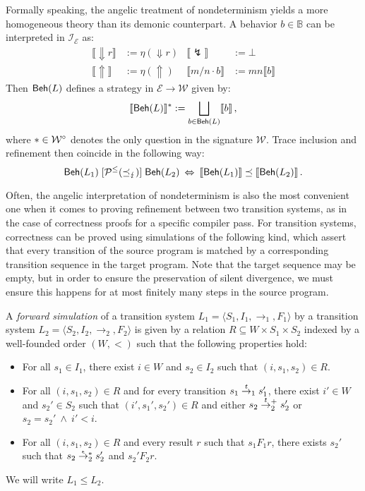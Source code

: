 \documentclass[sigplan,10pt,authordraft]{acmart}
\begin{document}
Formally speaking,
the angelic treatment of nondeterminism
yields a more homogeneous theory
than its demonic counterpart.
A behavior $b \in \mathbb{B}$ can be interpreted
in $\mathcal{I}_\mathcal{E}$ as:
\begin{align*}
  \llbracket {\Downarrow}r \rrbracket &:= \eta({\Downarrow} r) &
  \llbracket {\lightning} \rrbracket &:= \bot \\
  \llbracket {\Uparrow} \rrbracket &:= \eta({\Uparrow}) &
  \llbracket m / n \cdot b \rrbracket &:=
    m n \llbracket b \rrbracket
\end{align*}
Then $ \mathsf{Beh} (L)$ defines a strategy
in $\mathcal{E} \rightarrow \mathcal{W}$ given by:
\[
  \llbracket  \mathsf{Beh} (L) \rrbracket^* :=
    \bigsqcup_{b \in  \mathsf{Beh} (L)} \llbracket b \rrbracket
  \,,
\]
where $* \in \mathcal{W}^\circ$ denotes the only question
in the signature $\mathcal{W}$.
Trace inclusion and refinement then
coincide in the following way:
\[
   \mathsf{Beh} (L_1)
  \mathrel{[{\mathcal{P}^\le({\preceq_\lightning})}]}
   \mathsf{Beh} (L_2)
  \: \Leftrightarrow \:
  \llbracket  \mathsf{Beh} (L_1) \rrbracket
  \preceq
  \llbracket  \mathsf{Beh} (L_2) \rrbracket
  \,.
\]

Often,
the angelic interpretation of nondeterminism
is also the most convenient one
when it comes to proving refinement between
two transition systems,
as in the case of correctness proofs for
a specific compiler pass.
For transition systems,
correctness can be proved using simulations of the following kind,
which assert that every transition of the source program
is matched by a corresponding transition sequence in the target program.
Note that the target sequence may be empty,
but in order to ensure the preservation of silent divergence,
we must ensure this happens for at most
finitely many steps in the source program.

\begin{definition}
A \emph{forward simulation}
of a transition system
$L_1 = \langle S_1, I_1, {\rightarrow}_1, F_1 \rangle$
by a transition system
$L_2 = \langle S_2, I_2, {\rightarrow}_2, F_2 \rangle$
is given by a relation $R \subseteq W \times S_1 \times S_2$
indexed by a well-founded order $(W, {<})$
such that the following properties hold:
\begin{itemize}
  \item For all $s_1 \in I_1$,
    there exist $i \in W$ and $s_2 \in I_2$
    such that $(i, s_1, s_2) \in R$.
  \item For all $(i, s_1, s_2) \in R$
    and for every transition
    $s_1 \mathrel{\smash{\stackrel{t}{\rightarrow}}_1} s_1'$,
    there exist $i' \in W$ and $s_2' \in S_2$
    such that $(i', s_1', s_2') \in R$ and either
    $s_2 \mathrel{\smash{\stackrel{t}{\rightarrow}}_2^+} s_2'$ or
    $s_2 = s_2' \:\wedge\: i' < i$.
  \item For all $(i, s_1, s_2) \in R$
    and every result $r$ such that $s_1 \mathrel{F_1} r$,
    there exists $s_2'$ such that
    $s_2 \mathrel{\smash{\stackrel{\epsilon}{\rightarrow}}_2^*} s_2'$ and
    $s_2' \mathrel{F_2} r$.
\end{itemize}
We will write $L_1 \le L_2$.
\end{definition}
\end{document}
